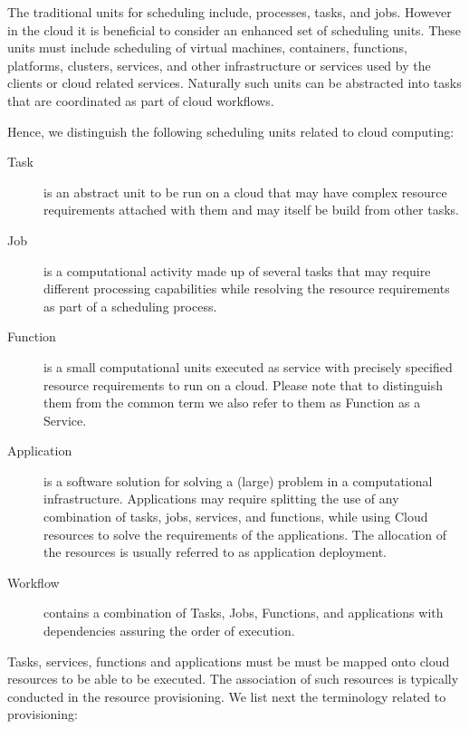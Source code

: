 \documentclass[final,5p,times,twocolumn]{elsarticle}
\begin{document}
The traditional units for scheduling include, processes, tasks, and
jobs. However in the cloud it is beneficial to consider an enhanced
set of scheduling units. These units must include scheduling of
virtual machines, containers, functions, platforms, clusters,
services, and other infrastructure or services used by the clients or
cloud related services. Naturally such units can be abstracted into
tasks that are coordinated as part of cloud workflows.

Hence, we distinguish the following scheduling units related to cloud
computing:

\begin{description}

\item[Task] is an abstract unit to be run on a cloud that may
  have complex resource requirements attached with them and may itself be
  build from other tasks. 

\item[Job] is a computational activity made up of several tasks
  that may require different processing capabilities while resolving
  the resource requirements as part of a scheduling process.

\item[Function] is a small computational units executed as
  service with precisely specified resource requirements to run on a
  cloud. Please note that to distinguish them from the common term we
  also refer to them as Function as a Service.

\item[Application] is a software solution for solving a (large)
  problem in a computational infrastructure. Applications may require
  splitting the use of any combination of tasks, jobs, services, and
  functions, while using Cloud resources to solve the requirements of
  the applications. The allocation of the resources is usually
  referred to as application deployment.

\item[Workflow] contains a combination of Tasks, Jobs,
  Functions, and applications with dependencies assuring the order of
  execution.

\end{description}

Tasks, services, functions and applications must be must be mapped
onto cloud resources to be able to be executed. The association of
such resources is typically conducted in the resource provisioning. We
list next the terminology related to provisioning:
\end{document}
